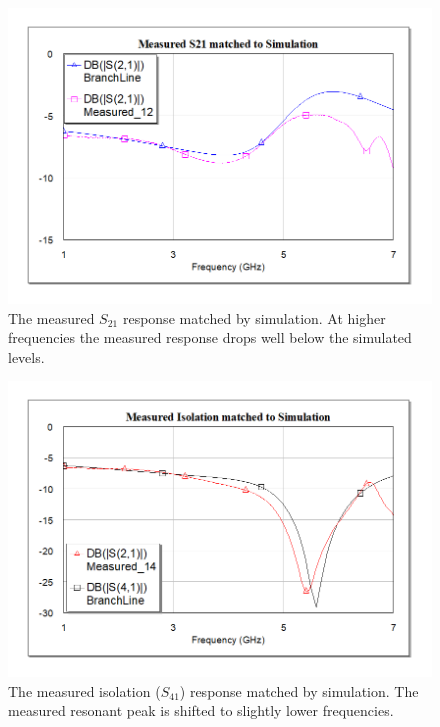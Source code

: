 \documentclass[twocolumn, aps, apl]{revtex4-1}
\begin{document}
\begin{figure}[!htbp]
    \centering
    \includegraphics[scale=0.4]{ThroMatch.png}
    \caption{The measured $S_{21}$ response matched by simulation. At higher frequencies the measured response drops well below the simulated levels. }
    \label{fig:thromatch}
\end{figure}

\begin{figure}[!htbp]
    \centering
    \includegraphics[scale=0.4]{IsolationMatch.png}
    \caption{The measured isolation ($S_{41}$) response matched by simulation. The measured resonant peak is shifted to slightly lower frequencies. }
    \label{fig:isolationmatch}
\end{figure}
\end{document}
